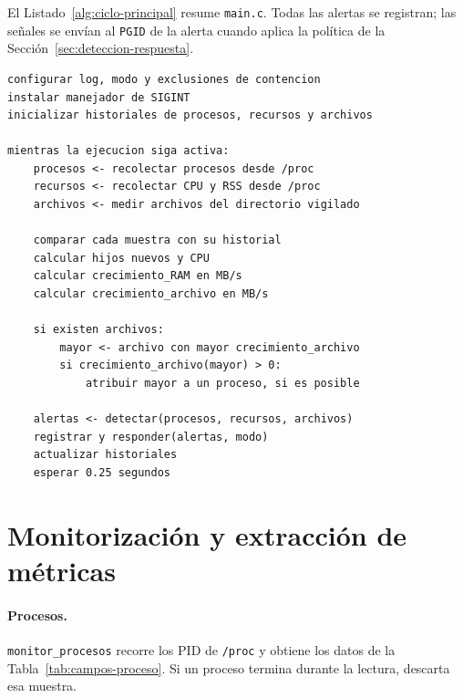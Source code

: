 El Listado~\ref{alg:ciclo-principal} resume \texttt{main.c}. Todas las alertas
se registran; las señales se envían al \texttt{PGID} de la alerta cuando aplica
la política de la Sección~\ref{sec:deteccion-respuesta}.

\begin{lstlisting}[style=pseudocodigo,caption={Funcionamiento general de anti-bunny-virus.},label={alg:ciclo-principal}]
configurar log, modo y exclusiones de contencion
instalar manejador de SIGINT
inicializar historiales de procesos, recursos y archivos

mientras la ejecucion siga activa:
    procesos <- recolectar procesos desde /proc
    recursos <- recolectar CPU y RSS desde /proc
    archivos <- medir archivos del directorio vigilado

    comparar cada muestra con su historial
    calcular hijos nuevos y CPU
    calcular crecimiento_RAM en MB/s
    calcular crecimiento_archivo en MB/s

    si existen archivos:
        mayor <- archivo con mayor crecimiento_archivo
        si crecimiento_archivo(mayor) > 0:
            atribuir mayor a un proceso, si es posible

    alertas <- detectar(procesos, recursos, archivos)
    registrar y responder(alertas, modo)
    actualizar historiales
    esperar 0.25 segundos
\end{lstlisting}

\section{Monitorización y extracción de métricas}

\paragraph{Procesos.}

\texttt{monitor\_procesos} recorre los PID de \texttt{/proc} y obtiene los datos
de la Tabla~\ref{tab:campos-proceso}. Si un proceso termina durante la lectura,
descarta esa muestra.

